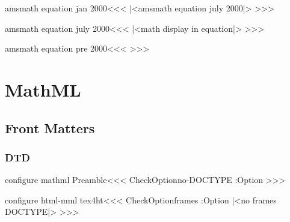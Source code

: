 
   


\<amsmath equation jan 2000\><<<
|<amsmath equation july 2000|>%
>>>







\<amsmath equation july 2000\><<<
     {\IgnorePar 
         |<math display in equation|>}
     {}
     {}
     {}
     {\ifnum{} \IgnorePar
         \fi }
     {}
>>>

\<amsmath equation pre 2000\><<<
\Configure{$$}{}{}{}%
  {\Configure{$$}
    {\IgnorePar\EndP\DviMath}
    {\EndDviMath\EndP}%
    {}%
   \IgnorePar
  }{}{}{}{}{}
>>>









\chapter{MathML}
\section{Front Matters}



\subsection{DTD}

\<configure mathml Preamble\><<<  
\:CheckOption{no-DOCTYPE} \if:Option
\fi
>>>



\<configure html-mml tex4ht\><<<
\:CheckOption{frames}  \if:Option 
   \else       
      |<no frames DOCTYPE|>
\fi
>>>




